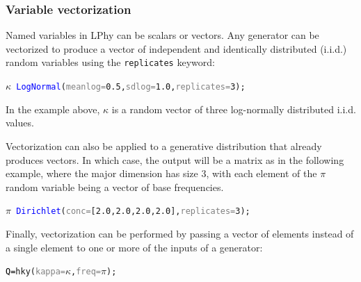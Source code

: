 \documentclass[10pt,letterpaper,table]{article}
\begin{document}


\subsubsection{Variable vectorization}

Named variables in LPhy can be scalars or vectors. Any generator can be vectorized to produce a vector of independent and identically distributed (i.i.d.) random variables using the \texttt{replicates} keyword:

{\small
\begin{alltt}
    \textcolor{bluishgreen}{\(\kappa\)} ~ \textcolor{blue}{LogNormal}(\textcolor{gray}{meanlog=}\textcolor{constant}{0.5}, \textcolor{gray}{sdlog=}\textcolor{constant}{1.0}, \textcolor{gray}{replicates=}\textcolor{constant}{3});
\end{alltt}
}

In the example above, $\kappa$ is a random vector of three log-normally distributed i.i.d. values.

Vectorization can also be applied to a generative distribution that already produces vectors. In which case, the output will be a matrix as in the following example, where the major dimension has size 3, with each element of the $\pi$ random variable being a vector of base frequencies.

{\small
\begin{alltt}
      \textcolor{bluishgreen}{\(\pi\)} ~ \textcolor{blue}{Dirichlet}(\textcolor{gray}{conc=}[\textcolor{constant}{2.0}, \textcolor{constant}{2.0}, \textcolor{constant}{2.0}, \textcolor{constant}{2.0}], \textcolor{gray}{replicates=}\textcolor{constant}{3});
\end{alltt}
}

Finally, vectorization can be performed by passing a vector of elements instead of a single element to one or more of the inputs of a generator:

{\small
\begin{alltt}
    \textcolor{black}{Q = }\textcolor{generator}{hky}(\textcolor{gray}{kappa=}\textcolor{bluishgreen}{\(\kappa\)}, \textcolor{gray}{freq=}\textcolor{bluishgreen}{\(\pi\)});
\end{alltt} 
}
\end{document}
